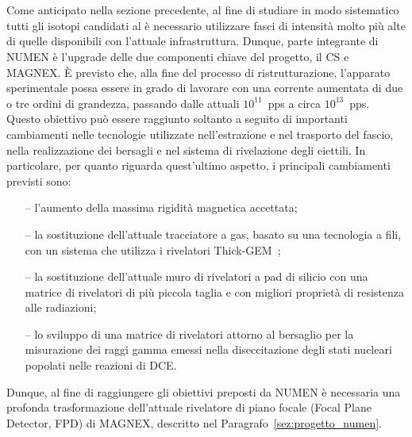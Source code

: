 

\section{}

Come anticipato nella sezione precedente, al fine di studiare in modo sistematico tutti gli isotopi candidati al \doppiobeta{} è necessario utilizzare fasci di intensità molto più alte di quelle disponibili con l'attuale infrastruttura. Dunque, parte integrante di NUMEN è l'upgrade delle due componenti chiave del progetto, il CS e MAGNEX. 
È previsto che, alla fine del processo di ristrutturazione, l'apparato sperimentale possa essere in grado di lavorare con una corrente aumentata di due o tre ordini di grandezza, passando dalle attuali $10^{11}$~pps a circa $10^{13}$~pps.
Questo obiettivo può essere raggiunto soltanto a seguito di importanti cambiamenti nelle tecnologie utilizzate nell'estrazione e nel trasporto del fascio, nella realizzazione dei bersagli e nel sistema di rivelazione degli eiettili. 
In particolare, per quanto riguarda quest'ultimo aspetto, i principali cambiamenti previsti sono:
\begin{itemize}
	\item[--] l'aumento della massima rigidità magnetica accettata;
	\item[--] la sostituzione dell'attuale tracciatore a gas, basato su una tecnologia a fili, con un sistema che utilizza i rivelatori Thick-GEM~\cite{cortesi:rsi17};
	\item[--] la sostituzione dell'attuale muro di rivelatori a pad di silicio con una matrice di rivelatori di più piccola taglia e con migliori proprietà di resistenza alle radiazioni;
	\item[--] lo sviluppo di una matrice di rivelatori attorno al bersaglio per la misurazione dei raggi gamma emessi nella diseccitazione degli stati nucleari popolati nelle reazioni di DCE.
\end{itemize}
Dunque, al fine di raggiungere gli obiettivi preposti da NUMEN è necessaria una profonda trasformazione dell'attuale rivelatore di piano focale (Focal Plane Detector, FPD) di MAGNEX, descritto nel Paragrafo~\ref{sez:progetto_numen}.


